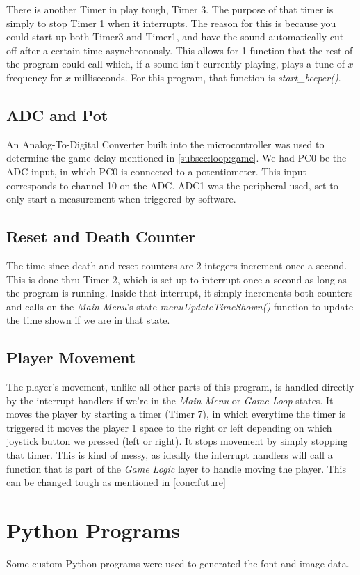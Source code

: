 \documentclass[12pt, a4paper]{article}
\begin{document}
    There is another Timer in play tough, Timer 3. The purpose of that timer is simply to stop Timer 1 when it interrupts. The reason for this is because you could start up both Timer3 and Timer1, and have the sound automatically cut off after a certain time asynchronously. This allows for 1 function that the rest of the program could call which, if a sound isn't currently playing, plays a tune of $x$ frequency for $x$ milliseconds. For this program, that function is \textit{start\_beeper()}.
    \subsection{ADC and Pot}
    An Analog-To-Digital Converter built into the microcontroller was used to determine the game delay mentioned in \cref{subsec:loop:game}. We had PC0 be the ADC input, in which PC0 is connected to a potentiometer. This input corresponds to channel 10 on the ADC. ADC1 was the peripheral used, set to only start a measurement when triggered by software. 
    \subsection{Reset and Death Counter} \label{soft:comp:counter}
    The time since death and reset counters are 2 integers increment once a second. This is done thru Timer 2, which is set up to interrupt once a second as long as the program is running. Inside that interrupt, it simply increments both counters and calls on the \textit{Main Menu}'s state \textit{menuUpdateTimeShown()} function to update the time shown if we are in that state.
    \subsection{Player Movement} \label{soft:comp:pla}
    The player's movement, unlike all other parts of this program, is handled directly by the interrupt handlers if we're in the \textit{Main Menu} or \textit{Game Loop} states. It moves the player by starting a timer (Timer 7), in which everytime the timer is triggered it moves the player 1 space to the right or left depending on which joystick button we pressed (left or right). It stops movement by simply stopping that timer. This is kind of messy, as ideally the interrupt handlers will call a function that is part of the \textit{Game Logic} layer to handle moving the player. This can be changed tough as mentioned in \cref{conc:future}
    
    \section{Python Programs}
    Some custom Python programs were used to generated the font and image data.
\end{document}
